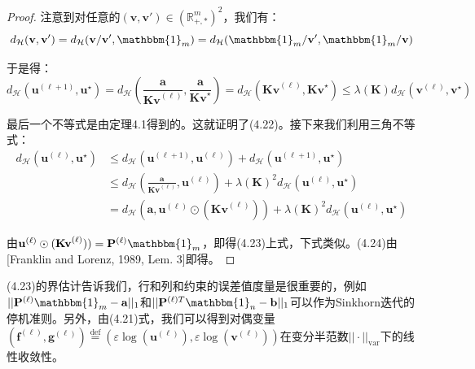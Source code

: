 \documentclass[cn,10pt,math=newtx,citestyle=gb7714-2015,bibstyle=gb7714-2015]{elegantbook}
\begin{document}
\begin{proof}
注意到对任意的$(\mathbf{v,v'})\in (\mathbb{R}_{+,*}^{m})^2$，我们有：
\begin{equation*}
    d_\mathcal{H}(\mathbf{v,v'}) = d_\mathcal{H}(\mathbf{v/v'},\mathbbm{1}_m) = d_\mathcal{H}(\mathbbm{1}_m/\mathbf{v'}, \mathbbm{1}_m/\mathbf{v})
\end{equation*}

于是得：
\begin{equation*}
    d_\mathcal{H}(\mathbf{u}^{(\ell+1)},\mathbf{u}^\star) = d_\mathcal{H}(\frac{\mathbf{a}}{\mathbf{Kv}^{(\ell)}}, \frac{\mathbf{a}}{\mathbf{Kv}^\star}) = d_\mathcal{H}(\mathbf{Kv}^{(\ell)}, \mathbf{Kv}^\star) \leq \lambda(\mathbf{K})d_\mathcal{H}(\mathbf{v}^{(\ell)},\mathbf{v}^\star)
\end{equation*}

最后一个不等式是由定理4.1得到的。这就证明了(4.22)。接下来我们利用三角不等式：
\begin{align*}
    d_\mathcal{H}(\mathbf{u}^{(\ell)},\mathbf{u}^\star) &\leq d_\mathcal{H}(\mathbf{u}^{(\ell+1)},\mathbf{u}^{(\ell)}) + d_\mathcal{H}(\mathbf{u}^{(\ell+1)},\mathbf{u}^\star) \\
    &\leq d_\mathcal{H}(\frac{\mathbf{a}}{\mathbf{Kv}^{(\ell)}},\mathbf{u}^{(\ell)}) + \lambda(\mathbf{K})^2d_\mathcal{H}(\mathbf{u}^{(\ell)},\mathbf{u}^\star)\\
    &= d_\mathcal{H}(\mathbf{a},\mathbf{u}^{(\ell)}\odot (\mathbf{Kv}^{(\ell)})) + \lambda(\mathbf{K})^2d_\mathcal{H}(\mathbf{u}^{(\ell)},\mathbf{u}^\star)
\end{align*}

由$\mathbf{u}^{(\ell)}\odot (\mathbf{Kv}^{(\ell)})) = \mathbf{P}^{(\ell)}\mathbbm{1}_m$，即得(4.23)上式，下式类似。(4.24)由[Franklin and Lorenz, 1989, Lem. 3]即得。
\end{proof}

(4.23)的界估计告诉我们，行和列和约束的误差值度量是很重要的，例如$||\mathbf{P}^{(\ell)}\mathbbm{1}_m-\mathbf{a}||_1$和$||\mathbf{P}^{(\ell)T}\mathbbm{1}_n-\mathbf{b}||_1$可以作为Sinkhorn迭代的停机准则。另外，由(4.21)式，我们可以得到对偶变量$(\mathbf{f}^{(\ell)},\mathbf{g}^{(\ell)}) \overset{\text{def}}{=} (\varepsilon \log(\mathbf{u}^{(\ell)}), \varepsilon \log(\mathbf{v}^{(\ell)}))$在变分半范数$||\cdot||_{\text{var}}$下的线性收敛性。
\end{document}
